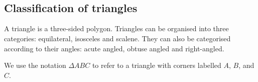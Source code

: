 \\
\\
% 
        \subsection*{Classification of triangles}
A triangle is a three-sided polygon. Triangles can be organised into three categories: equilateral, isosceles and scalene. They can also be categorised according to their angles: acute angled, obtuse angled and right-angled. \par 
We use the notation $\Delta ABC$ to
refer to a triangle with corners labelled $A$,
$B$, and $C$.\par 
{}
